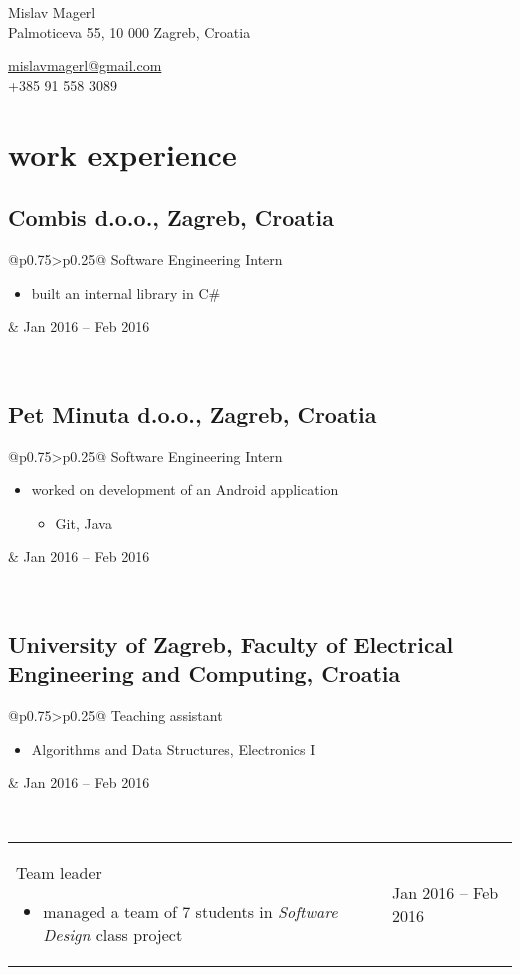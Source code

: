 \documentclass[a4paper]{article}
\makeatletter
\newlength{\tablewidth}
\newenvironment{period}[2]{%
\newcommand{\sarma}{#2}%
\setlength{\tablewidth}{\linewidth}
\addtolength{\tablewidth}{-2\tabcolsep}
\begin{tabular}{@{}p{0.75\tablewidth}>{\raggedleft\arraybackslash}p{0.25\tablewidth}@{}}%
#1 \newline
\begin{itemize}
}{%
\end{itemize} & \sarma \\%
\end{tabular}\\
}
\makeatother
\begin{document}
\fontfamily{\sfdefault}
\selectfont

\begin{minipage}{.5\textwidth}
\LARGE{Mislav Magerl}\\
\normalsize{Palmoticeva 55, 10 000 Zagreb, Croatia}
\end{minipage}%
\begin{minipage}{.5\textwidth}
\raggedleft
\href{mailto:mislavmagerl@gmail.com}{mislavmagerl@gmail.com} \\
+385 91 558 3089
\end{minipage}

\vspace{1em}

\section{work experience}
\subsection{Combis d.o.o., Zagreb, Croatia}
\begin{period}{Software Engineering Intern}{Jan 2016 -- Feb 2016}
    \item 
        built an internal library in C\#
        
\end{period}
\subsection{Pet Minuta d.o.o., Zagreb, Croatia}
\begin{period}{Software Engineering Intern}{Jul 2015 -- Aug 2015}
    \item 
        worked on development of an Android application
        \begin{itemize}
   			\item
    			Git, Java
    		\end{itemize}
\end{period}
\subsection{University of Zagreb, Faculty of Electrical Engineering and Computing, Croatia}
\begin{period}{Teaching assistant}{Mar 2013 -- Jan 2014}
    \item Algorithms and Data Structures, Electronics I
\end{period}
\begin{period}{Team leader}{Sep 2014 -- Jan 2015}
    \item managed a team of 7 students in \textit{Software Design} class project
\end{period}
\end{document}
